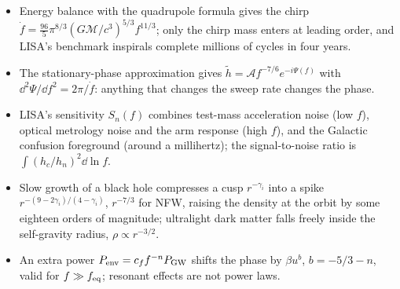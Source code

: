 \begin{recap}
\begin{itemize}[itemsep=1pt]
  \item Energy balance with the quadrupole formula gives the chirp $\dot f=\frac{96}{5}\pi^{8/3}(G\mathcal M/c^3)^{5/3}f^{11/3}$; only the chirp mass enters at leading order, and LISA's benchmark inspirals complete millions of cycles in four years.
  \item The stationary-phase approximation gives $\tilde h=\mathcal Af^{-7/6}e^{-i\Psi(f)}$ with $\dd^2\Psi/\dd f^2=2\pi/\dot f$: anything that changes the sweep rate changes the phase.
  \item LISA's sensitivity $S_n(f)$ combines test-mass acceleration noise (low $f$), optical metrology noise and the arm response (high $f$), and the Galactic confusion foreground (around a millihertz); the signal-to-noise ratio is $\int(h_c/h_n)^2\dd\ln f$.
  \item Slow growth of a black hole compresses a cusp $r^{-\gamma_i}$ into a spike $r^{-(9-2\gamma_i)/(4-\gamma_i)}$, $r^{-7/3}$ for NFW, raising the density at the orbit by some eighteen orders of magnitude; ultralight dark matter falls freely inside the self-gravity radius, $\rho\propto r^{-3/2}$.
  \item An extra power $P_{\rm env}=c_ff^{-n}P_{\rm GW}$ shifts the phase by $\beta u^{b}$, $b=-5/3-n$, valid for $f\gg f_{\rm eq}$; resonant effects are not power laws.
\end{itemize}
\end{recap}

